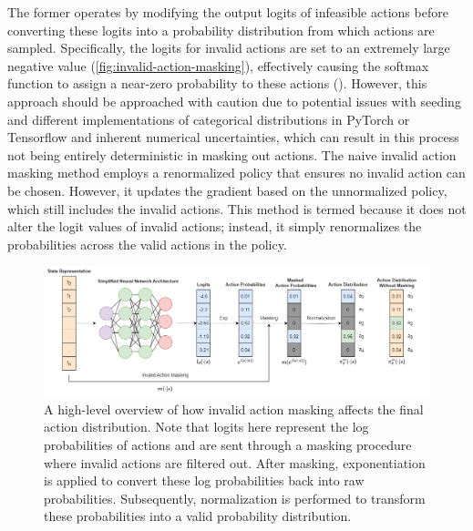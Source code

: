             \noindent The former operates by modifying the output logits of infeasible actions before converting these logits into a probability distribution from which actions are sampled. Specifically, the logits for invalid actions are set to an extremely large negative value (\textcolor{deepblue}{\autoref{fig:invalid-action-masking}}), effectively causing the softmax function to assign a near-zero probability to these actions (\textcolor{deepblue}{\cite{Huang_2022}}). However, this approach should be approached with caution due to potential issues with seeding and different implementations of categorical distributions in PyTorch or Tensorflow and inherent numerical uncertainties, which can result in this process not being entirely deterministic in masking out actions. The naive invalid action masking method employs a renormalized policy that ensures no invalid action can be chosen. However, it updates the gradient based on the unnormalized policy, which still includes the invalid actions. This method is termed  because it does not alter the logit values of invalid actions; instead, it simply renormalizes the probabilities across the valid actions in the policy.
            
            \bigskip
            
            \begin{figure}[htbp]
                \centering
                \includegraphics[width=1\linewidth]{images/methods_algos/m_ppo/invalidactionmasking.png}
                \captionsetup{justification=justified, singlelinecheck=false, width=1\linewidth, labelfont=bf} 
                \caption[]{A high-level overview of how invalid action masking affects the final action distribution. Note that logits here represent the log probabilities of actions and are sent through a masking procedure where invalid actions are filtered out. After masking, exponentiation is applied to convert these log probabilities back into raw probabilities. Subsequently, normalization is performed to transform these probabilities into a valid probability distribution.}
                \label{fig:invalid-action-masking}
            \end{figure}
            
